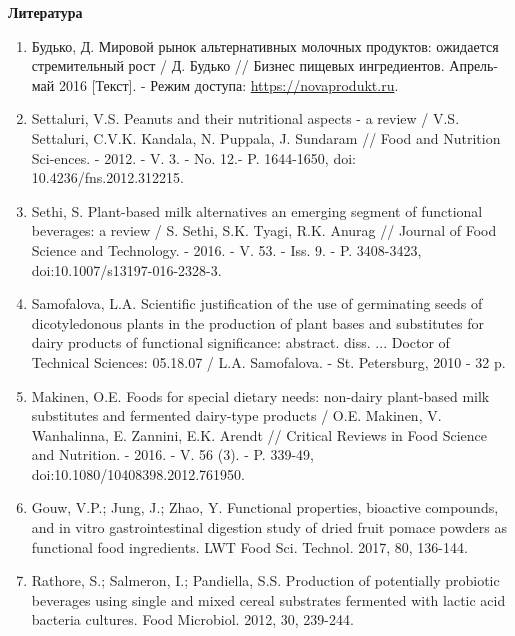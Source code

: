 \begin{center}
{\bfseries Литература}
\end{center}

\begin{enumerate}
\item
Будько, Д. Мировой рынок альтернативных молочных продуктов: ожидается
стремительный рост / Д. Будько // Бизнес пищевых ингредиентов.
Апрель-май 2016 {[}Текст{]}. - Режим доступа:
\href{https://novaprodukt.ru/ing/articles/non\_dairy\_milk/}{https://novaprodukt.ru}.

\item
Settaluri, V.S. Peanuts and their nutritional aspects - a review /
V.S. Settaluri, C.V.K. Kandala, N. Puppala, J. Sundaram // Food and
Nutrition Sci-ences. - 2012. - V. 3. - No. 12.- P. 1644-1650, doi:
10.4236/fns.2012.312215.

\item
Sethi, S. Plant-based milk alternatives an emerging segment of
functional beverages: a review / S. Sethi, S.K. Tyagi, R.K. Anurag //
Journal of Food Science and Technology. - 2016. - V. 53. - Iss. 9. -
P. 3408-3423, doi:10.1007/s13197-016-2328-3.

\item
Samofalova, L.A. Scientific justification of the use of germinating
seeds of dicotyledonous plants in the production of plant bases and
substitutes for dairy products of functional significance: abstract.
diss. ... Doctor of Technical Sciences: 05.18.07 / L.A. Samofalova. -
St. Petersburg, 2010 - 32 p.

\item
Makinen, O.E. Foods for special dietary needs: non-dairy plant-based
milk substitutes and fermented dairy-type products / O.E. Makinen, V.
Wanhalinna, E. Zannini, E.K. Arendt // Critical Reviews in Food Science
and Nutrition. - 2016. - V. 56 (3). - P. 339-49,
doi:10.1080/10408398.2012.761950.

\item
Gouw, V.P.; Jung, J.; Zhao, Y. Functional properties, bioactive
compounds, and in vitro gastrointestinal digestion study of dried fruit
pomace powders as functional food ingredients. LWT Food Sci. Technol.
2017, 80, 136-144.

\item
Rathore, S.; Salmeron, I.; Pandiella, S.S. Production of potentially
probiotic beverages using single and mixed cereal substrates fermented
with lactic acid bacteria cultures. Food Microbiol. 2012, 30, 239-244.


\end{enumerate}
